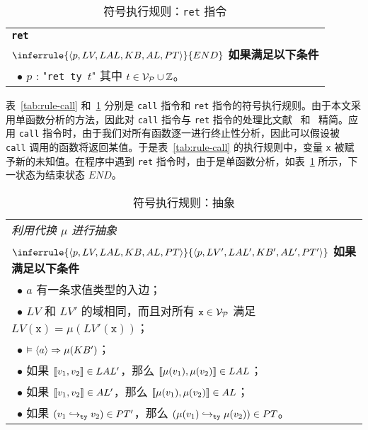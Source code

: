 \begin{table}[htbp]
\caption{符号执行规则：\texttt{ret} 指令}
\label{tab:rule-ret}
\begin{tabularx}{\textwidth}{|X|}
\hline
\textbf{\texttt{ret}} \\
{\centering $
\inferrule
   {\lb p, LV, LAL, KB, AL, PT\rb}
   {END}
$ \\}
\textbf{如果满足以下条件} \\
~$\bullet$ $p$ : "\texttt{ret ty $t$}" 其中 $t\in\mathcal{V}_{\mathcal{P}}\cup\mathbb{Z}$。\\
\hline
\end{tabularx}
\end{table}

表~\ref{tab:rule-call} 和~\ref{tab:rule-ret} 分别是 \verb|call| 指令和 \verb|ret| 指令的符号执行规则。由于本文采用单函数分析的方法，因此对 \verb|call| 指令与 \verb|ret| 指令的处理比文献~ 和~ 精简。应用 \verb|call| 指令时，由于我们对所有函数逐一进行终止性分析，因此可以假设被 \verb|call| 调用的函数将返回某值。于是表~\ref{tab:rule-call} 的执行规则中，变量 \verb|x| 被赋予新的未知值。在程序中遇到 \verb|ret| 指令时，由于是单函数分析，如表~\ref{tab:rule-ret} 所示，下一状态为结束状态 $END$。

\begin{table}[htbp]
\caption{符号执行规则：抽象}
\label{tab:rule-abstract}
\begin{tabularx}{\textwidth}{|X|}
\hline
\emph{利用代换 $\mu$ 进行抽象} \\
{\centering $
\inferrule
   {\lb p, LV, LAL, KB, AL, PT\rb}
   {\lb p, LV', LAL', KB', AL', PT'\rb }
$ \\}
\textbf{如果满足以下条件} \\
~$\bullet$ $a$ 有一条求值类型的入边； \\
~$\bullet$ $LV$ 和 $LV'$ 的域相同，而且对所有 $\texttt{x} \in\mathcal{V}_{\mathcal{P}}$ 满足 $LV(\texttt{x}) = \mu(LV'(\texttt{x}))$； \\
~$\bullet$ $\vDash \langle a\rangle \Rightarrow \mu(KB')$；\\
~$\bullet$ 如果 $\llbracket v_1,v_2 \rrbracket\in LAL'$，那么 $\llbracket \mu(v_1),\mu(v_2) \rrbracket\in LAL$； \\
~$\bullet$ 如果 $\llbracket v_1,v_2 \rrbracket\in AL'$，那么 $\llbracket \mu(v_1),\mu(v_2) \rrbracket\in AL$； \\
~$\bullet$ 如果 $(v_1\hookrightarrow_{\texttt{ty}} v_2)\in PT'$，那么 $(\mu(v_1)\hookrightarrow_{\texttt{ty}}\mu(v_2))\in PT$。 \\
\hline
\end{tabularx}
\end{table}

